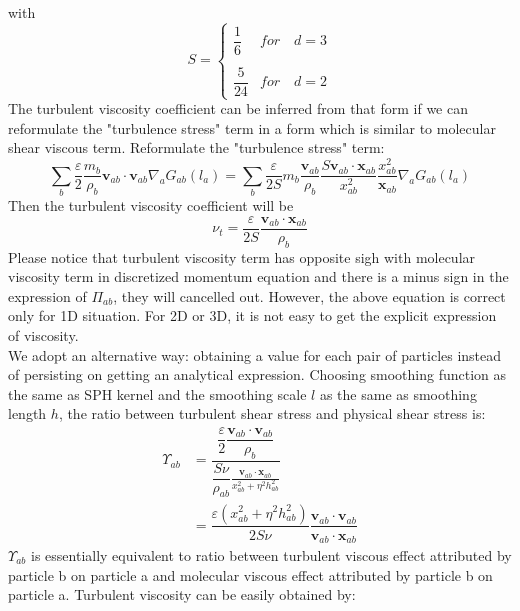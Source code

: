 \documentclass[journal abbreviation, manuscript]{copernicus}
\begin{document}
with
\begin{equation}
S= 
\begin{cases} 
      \dfrac{1}{6} & for  \quad d=3 \\
      \\
     \dfrac{5}{24}  & for  \quad d=2 
\end{cases}
\end{equation}
The turbulent viscosity coefficient can be inferred from that form if we can reformulate the "turbulence stress" term in a form which is similar to molecular shear viscous term.
Reformulate the "turbulence stress" term:
\begin{equation}
 \sum_b \dfrac{\varepsilon}{2} \dfrac{m_b}{\rho_b} \textbf{v}_{ab} \cdot \textbf{v}_{ab} \nabla_a G_{ab}(l_a)= \sum_b \dfrac{\varepsilon}{2S} m_b \dfrac{\textbf{v}_{ab}}{\rho_b} \dfrac{S \textbf{v}_{ab} \cdot \textbf{x}_{ab}}{x_{ab}^2} \dfrac{x_{ab}^2}{\textbf{x}_{ab}} \nabla_a G_{ab}(l_a) 
\end{equation}
Then the turbulent viscosity coefficient will be
\begin{equation}
\nu_t = \dfrac{\varepsilon}{2S} \dfrac{\textbf{v}_{ab} \cdot \textbf{x}_{ab}}{\rho_b}
\end{equation}
Please notice that turbulent viscosity term has opposite sigh with molecular viscosity term in discretized momentum equation and there is a minus sign in the expression of $\Pi_{ab}$, they will cancelled out.
However, the above equation is correct only for 1D situation. For 2D or 3D, it is not easy to get the explicit expression of viscosity. \\
We adopt an alternative way: obtaining a value for each pair of particles instead of persisting on getting an analytical expression. Choosing smoothing function as the same as SPH kernel and the smoothing scale $l$ as the same as smoothing length $h$, the ratio between turbulent shear stress and physical shear stress is: 
\begin{equation}
\begin{split}
\Upsilon_{ab} &= \dfrac{\dfrac{\varepsilon}{2} \dfrac{\textbf{v}_{ab} \cdot \textbf{v}_{ab}}{\rho_b}}{\dfrac{S \nu}{\rho_{ab}} \frac{\textbf{v}_{ab} \cdot \textbf{x}_{ab}}{x_{ab}^2 + \eta^2 h_{ab}^2}} \\
 & = \dfrac{\varepsilon (x_{ab}^2 + \eta^2 h_{ab}^2)}{2 S \nu} \dfrac{\textbf{v}_{ab} \cdot \textbf{v}_{ab}}{\textbf{v}_{ab} \cdot \textbf{x}_{ab}}
\end{split}
\end{equation}
$\Upsilon_{ab}$ is essentially equivalent to ratio between turbulent viscous effect attributed by particle b on particle a and molecular viscous effect attributed by particle b on particle a. Turbulent viscosity can be easily obtained by:
\end{document}
